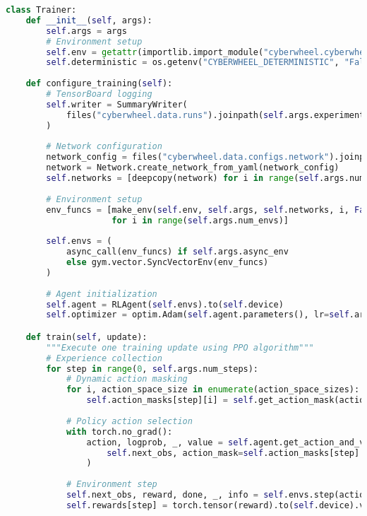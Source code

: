 \documentclass[12pt,a4paper]{article}
\begin{document}
\begin{lstlisting}[language=Python, caption=PPO Training Core Logic]
class Trainer:
    def __init__(self, args):
        self.args = args
        # Environment setup
        self.env = getattr(importlib.import_module("cyberwheel.cyberwheel_envs"), args.environment)
        self.deterministic = os.getenv("CYBERWHEEL_DETERMINISTIC", "False").lower() in ('true', '1', 't')
        
    def configure_training(self):
        # TensorBoard logging
        self.writer = SummaryWriter(
            files("cyberwheel.data.runs").joinpath(self.args.experiment_name)
        )
        
        # Network configuration
        network_config = files("cyberwheel.data.configs.network").joinpath(self.args.network_config)
        network = Network.create_network_from_yaml(network_config)
        self.networks = [deepcopy(network) for i in range(self.args.num_envs)]
        
        # Environment setup
        env_funcs = [make_env(self.env, self.args, self.networks, i, False) 
                     for i in range(self.args.num_envs)]
        
        self.envs = (
            async_call(env_funcs) if self.args.async_env 
            else gym.vector.SyncVectorEnv(env_funcs)
        )
        
        # Agent initialization
        self.agent = RLAgent(self.envs).to(self.device)
        self.optimizer = optim.Adam(self.agent.parameters(), lr=self.args.learning_rate, eps=1e-5)

    def train(self, update):
        """Execute one training update using PPO algorithm"""
        # Experience collection
        for step in range(0, self.args.num_steps):
            # Dynamic action masking
            for i, action_space_size in enumerate(action_space_sizes):
                self.action_masks[step][i] = self.get_action_mask(action_space_size, self.action_masks[step][i])
            
            # Policy action selection
            with torch.no_grad():
                action, logprob, _, value = self.agent.get_action_and_value(
                    self.next_obs, action_mask=self.action_masks[step]
                )
            
            # Environment step
            self.next_obs, reward, done, _, info = self.envs.step(action.cpu().numpy())
            self.rewards[step] = torch.tensor(reward).to(self.device).view(-1)
        

\end{lstlisting}
\end{document}
